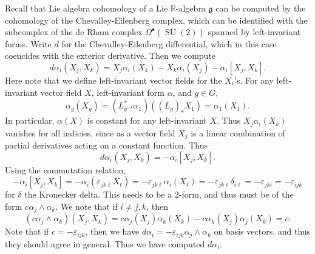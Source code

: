 \documentclass[11pt, letterpaper]{article}
\theoremstyle{plain}
\begin{document}
Recall that Lie algebra cohomology of a Lie $\mathbb{R} $-algebra $\mathfrak{g} $ can be computed by the cohomology of the Chevalley-Eilenberg complex, which can be identified with the subcomplex of the de Rham complex $\Omega ^{\bullet} (\operatorname{SU} (2))$ spanned by left-invariant forms. Write $d$ for the Chevalley-Eilenberg differential, which in this case coencides with the exterior derivative. Then we compute
\[
	d\alpha _i(X_j,X_k) = X_j \alpha_i(X_k) - X_k \alpha_i(X_j) - \alpha_i[X_j,X_k]
.\]
Here note that we define left-invariant vector fields for the $X_i$'s. For any left-invariant vector field $X$, left-invariant form $\alpha $, and $g\in G$,
\[
	\alpha _g(X_g) = (L_{g^{-1} }^*\alpha_1)((L_g)_*X_1) = \alpha _1(X_1)
.\]
In particular, $\alpha (X)$ is constant for any left-invariant $X$. Thus $X_j\alpha _i(X_k)$ vanishes for all indicies, since as a vector field $X_j$ is a linear combination of partial derivatives acting on a constant function. Thus
\[
	d\alpha _i(X_j,X_k)=-\alpha_i[X_j,X_k]
.\]
Using the commutation relation,
\[
	-\alpha _i[X_j,X_k]=-\alpha _i(\varepsilon _{jk\ell }X_\ell )=-\varepsilon _{jk\ell } \alpha _i(X_\ell ) = -\varepsilon _{jk\ell } \delta _{i\ell } =-\varepsilon _{jki} =-\varepsilon _{ijk}
\]
for $\delta $ the Kronecker delta. This needs to be a 2-form, and thus must be of the form $c\alpha _j \wedge \alpha _k$. We note that if $i\neq j,k$, then
\[
	(c\alpha _j \wedge \alpha _k)(X_j,X_k) = c\alpha _j(X_j)\alpha _k(X_k)-c\alpha _k(X_j)\alpha _j(X_k)=c
.\]
Note that if $c=-\varepsilon _{ijk} $, then we have $d\alpha _i = -\varepsilon _{ijk} \alpha _j \wedge \alpha _k$ on basis vectors, and thus they should agree in general. Thus we have computed $d\alpha _i$.
\end{document}
